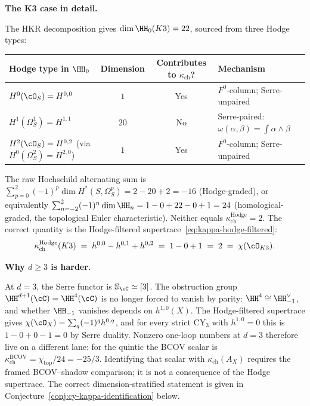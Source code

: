 \begin{remark}
\medskip\noindent
\textbf{The K3 case in detail.}

\smallskip\noindent
The HKR decomposition gives $\dim \HH_0(K3) = 22$, sourced from three Hodge types:
\begin{center}
\renewcommand{\arraystretch}{1.1}
\begin{tabular}{lccl}
 \toprule
 \textbf{Hodge type in $\HH_0$} & \textbf{Dimension} & \textbf{Contributes to $\kappa_{\mathrm{ch}}$?} & \textbf{Mechanism} \\
 \midrule
 $H^0(\cO_S) = H^{0,0}$ & $1$ & Yes & $F^0$-column; Serre-unpaired \\
 $H^1(\Omega^1_S) = H^{1,1}$ & $20$ & No & Serre-paired: $\omega(\alpha,\beta) = \int \alpha \wedge \beta$ \\
 $H^2(\cO_S) = H^{0,2}$ (via $H^0(\Omega^2_S) = H^{2,0}$) & $1$ & Yes & $F^0$-column; Serre-unpaired \\
 \bottomrule
\end{tabular}
\end{center}
The raw Hochschild alternating sum is $\sum_{p=0}^{2}(-1)^p \dim H^*(S, \Omega^p_S) = 2 - 20 + 2 = -16$ (Hodge-graded), or equivalently $\sum_{n=-2}^{2} (-1)^n \dim \HH_n = 1 - 0 + 22 - 0 + 1 = 24$ (homological-graded, the topological Euler characteristic). Neither equals $\kappa_{\mathrm{ch}}^{\mathrm{Hodge}} = 2$. The correct quantity is the Hodge-filtered supertrace~\eqref{eq:kappa-hodge-filtered}:
\[
 \kappa_{\mathrm{ch}}^{\mathrm{Hodge}}(K3) \;=\; h^{0,0} - h^{0,1} + h^{0,2} \;=\; 1 - 0 + 1 \;=\; 2 \;=\; \chi(\cO_{K3}).
\]

\medskip\noindent
\textbf{Why $d \geq 3$ is harder.}

\smallskip\noindent
At $d = 3$, the Serre functor is $\mathbb{S}_\cC \simeq [3]$. The obstruction group $\HH^{d+1}(\cC) = \HH^4(\cC)$ is no longer forced to vanish by parity: $\HH^4 \cong \HH_{-1}^\vee$, and whether $\HH_{-1}$ vanishes depends on $h^{1,0}(X)$. The Hodge-filtered supertrace gives $\chi(\cO_X) = \sum_q (-1)^q h^{0,q}$, and for every strict CY$_3$ with $h^{1,0} = 0$ this is $1 - 0 + 0 - 1 = 0$ by Serre duality. Nonzero one-loop numbers at $d = 3$ therefore live on a different lane: for the quintic the BCOV scalar is $\kappa_{\mathrm{ch}}^{\mathrm{BCOV}}=\chi_{\mathrm{top}}/24=-25/3$. Identifying that scalar with $\kappa_{\mathrm{ch}}(A_X)$ requires the framed BCOV--shadow comparison; it is not a consequence of the Hodge supertrace. The correct dimension-stratified statement is given in Conjecture~\ref{conj:cy-kappa-identification} below.


\end{remark}
